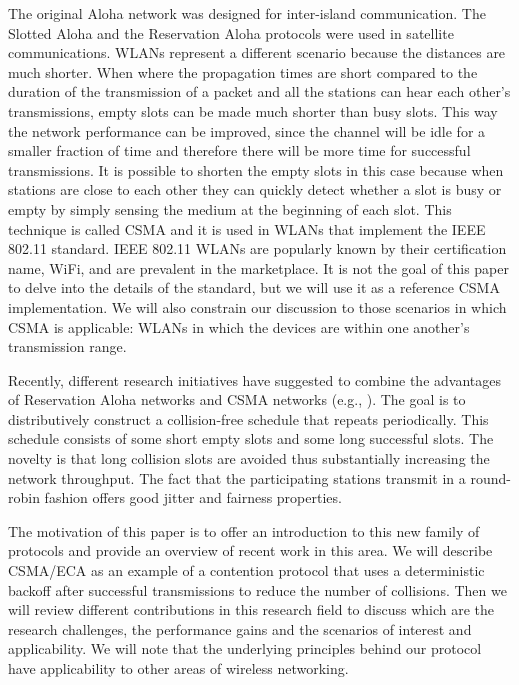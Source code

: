 \documentclass[journal]{IEEEtran}
\begin{document}
The original Aloha network was designed for inter-island communication.
The Slotted Aloha and the Reservation Aloha protocols were used in satellite communications.
WLANs represent a different scenario because the distances are much shorter.
When where the propagation times are short compared to the duration of the transmission of a packet and all the stations can hear each other's transmissions, empty slots can be made much shorter than busy slots.
This way the network performance can be improved, since the channel will be idle for a smaller fraction of time and therefore there will be more time for successful transmissions.
It is possible to shorten the empty slots in this case because when stations are close to each other they can quickly detect whether a slot is busy or empty by simply sensing the medium at the beginning of each slot.
This technique is called CSMA and  it is used in WLANs that implement the IEEE 802.11 standard.
IEEE 802.11 WLANs are popularly known by their certification name, WiFi, and are prevalent in the marketplace.
It is not the goal of this paper to delve into the details of the standard, but we will use it as a reference CSMA implementation.
We will also constrain our discussion to those scenarios in which CSMA is applicable: WLANs in which the devices are within one another's transmission range.

Recently, different research initiatives have suggested to combine the advantages of Reservation Aloha networks and CSMA networks (e.g., \cite{he2009srb,barcelo2010fcc,fang2011dlm,barcelo2011tcf,martorell2012pec}). 
The goal is to distributively construct a collision-free schedule that repeats periodically.
This schedule consists of some short empty slots and some long successful slots.
The novelty is that long collision slots are avoided thus substantially increasing the network throughput.
The fact that the participating stations transmit in a round-robin fashion offers good jitter and fairness properties.

The motivation of this paper is to offer an introduction to this new family of protocols and provide an overview of recent work in this area.
We will describe CSMA/ECA as an example of a contention protocol that uses a deterministic backoff after successful transmissions to reduce the number of collisions.
Then we will review different contributions in this research field to discuss  which are the research challenges, the performance gains and the scenarios of interest and applicability.
We will note that the underlying principles behind our protocol have applicability to other areas of wireless networking.
\end{document}
